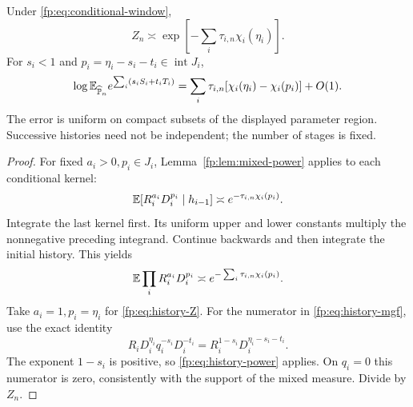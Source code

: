 \begin{theorem}\label{fp:thm:histories}
Under \eqref{fp:eq:conditional-window},
\begin{equation}\label{fp:eq:history-Z}
 Z_n\asymp\exp\left[-\sum_i\tau_{i,n}\chi_i(\eta_i)\right].
\end{equation}
For $s_i<1$ and $p_i=\eta_i-s_i-t_i\in\operatorname{int}J_i$,
\begin{equation}\label{fp:eq:history-mgf}
 \log\mathbb E_{\widehat{\mathbb P}_n}
 e^{\sum_i(s_iS_i+t_iT_i)}
 =\sum_i\tau_{i,n}[\chi_i(\eta_i)-\chi_i(p_i)]+O(1).
\end{equation}
The error is uniform on compact subsets of the displayed parameter region. Successive histories need not be independent; the number of stages is fixed.
\end{theorem}
\begin{proof}
For fixed $a_i>0,p_i\in J_i$, Lemma~\ref{fp:lem:mixed-power} applies to each conditional kernel:
\[
 \mathbb E[R_i^{a_i}D_i^{p_i}\mid h_{i-1}]
 \asymp e^{-\tau_{i,n}\chi_i(p_i)}.
\]
Integrate the last kernel first. Its uniform upper and lower constants multiply the nonnegative preceding integrand. Continue backwards and then integrate the initial history. This yields
\begin{equation}\label{fp:eq:history-power}
 \mathbb E\prod_iR_i^{a_i}D_i^{p_i}
 \asymp e^{-\sum_i\tau_{i,n}\chi_i(p_i)}.
\end{equation}
Take $a_i=1,p_i=\eta_i$ for \eqref{fp:eq:history-Z}. For the numerator in \eqref{fp:eq:history-mgf}, use the exact identity
\[
 R_iD_i^{\eta_i}q_i^{-s_i}D_i^{-t_i}
 =R_i^{1-s_i}D_i^{\eta_i-s_i-t_i}.
\]
The exponent $1-s_i$ is positive, so \eqref{fp:eq:history-power} applies. On $q_i=0$ this numerator is zero, consistently with the support of the mixed measure. Divide by $Z_n$.
\end{proof}

